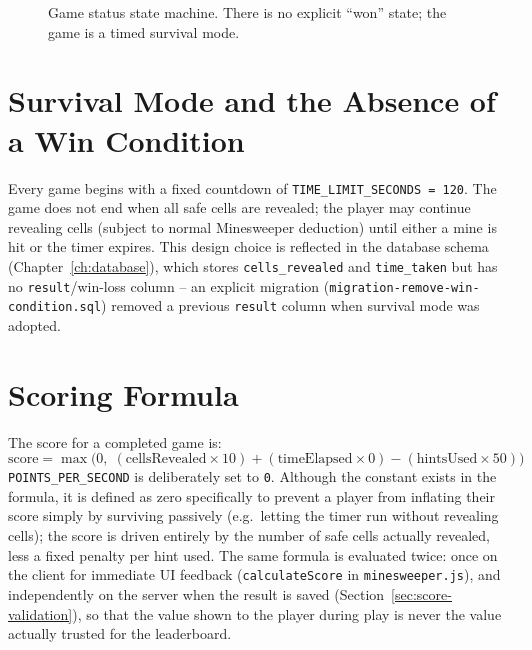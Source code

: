 \begin{figure}[htbp]
\centering
{}
\caption{Game status state machine. There is no explicit ``won'' state; the
game is a timed survival mode.}
\label{fig:game-state}
\end{figure}

\section{Survival Mode and the Absence of a Win Condition}
Every game begins with a fixed countdown of \texttt{TIME\_LIMIT\_SECONDS =
120}. The game does not end when all safe cells are revealed; the player may
continue revealing cells (subject to normal Minesweeper deduction) until
either a mine is hit or the timer expires. This design choice is reflected
in the database schema (Chapter~\ref{ch:database}), which stores
\texttt{cells\_revealed} and \texttt{time\_taken} but has no
\texttt{result}/win-loss column -- an explicit migration
(\texttt{migration-remove-win-condition.sql}) removed a previous
\texttt{result} column when survival mode was adopted.

\section{Scoring Formula}
\label{sec:scoring}
The score for a completed game is:
\[
\text{score} = \max\bigl(0,\; (\text{cellsRevealed} \times 10) +
(\text{timeElapsed} \times 0) - (\text{hintsUsed} \times 50)\bigr)
\]
\texttt{POINTS\_PER\_SECOND} is deliberately set to \texttt{0}. Although the
constant exists in the formula, it is defined as zero specifically to
prevent a player from inflating their score simply by surviving passively
(e.g.\ letting the timer run without revealing cells); the score is driven
entirely by the number of safe cells actually revealed, less a fixed penalty
per hint used. The same formula is evaluated twice: once on the client for
immediate UI feedback (\texttt{calculateScore} in \texttt{minesweeper.js}),
and independently on the server when the result is saved
(Section~\ref{sec:score-validation}), so that the value shown to the player
during play is never the value actually trusted for the leaderboard.


